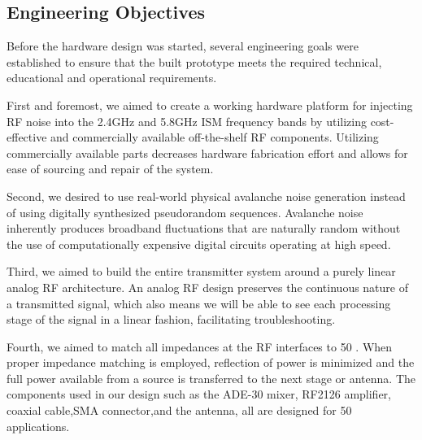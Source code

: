 \documentclass[12pt,a4paper]{report}
\begin{document}
	\subsection{Engineering Objectives}
	Before the hardware design was started, several engineering goals were established to ensure that the built prototype meets the required technical, educational and operational requirements.
	\vspace{0.5cm}
	
	First and foremost, we aimed to create a working hardware platform for injecting RF noise into the 2.4GHz and 5.8GHz ISM frequency bands by utilizing cost-effective and commercially available off-the-shelf RF components. Utilizing commercially available parts decreases hardware fabrication effort and allows for ease of sourcing and repair of the system.
	
	\vspace{0.5cm}
	
	Second, we desired to use real-world physical avalanche noise generation instead of using digitally synthesized pseudorandom sequences. Avalanche noise inherently produces broadband fluctuations that are naturally random without the use of computationally expensive digital circuits operating at high speed.
	\vspace{0.5cm}
	
	
	Third, we aimed to build the entire transmitter system around a purely linear analog RF architecture. An analog RF design preserves the continuous nature of a transmitted signal, which also means we will be able to see each processing stage of the signal in a linear fashion, facilitating troubleshooting.
	\vspace{0.5cm}
	
	
	Fourth, we aimed to match all impedances at the RF interfaces to 50 . When proper impedance matching is employed, reflection of power is minimized and the full power available from a source is transferred to the next stage or antenna. The components used in our design such as the ADE-30 mixer, RF2126 amplifier, coaxial cable,SMA connector,and the antenna, all are designed for 50 applications.
	\vspace{0.5cm}
	
\end{document}
